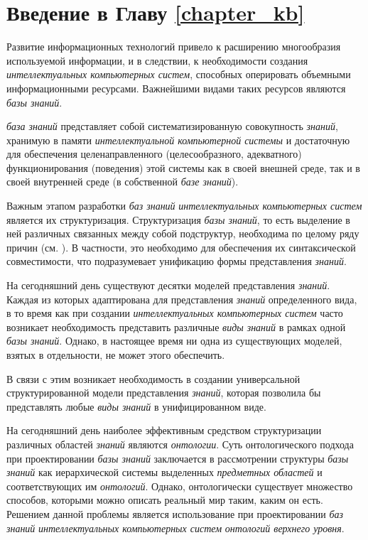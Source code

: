 \section*{Введение в Главу \ref{chapter_kb}}

Развитие информационных технологий привело к расширению многообразия используемой информации, и в следствии, к необходимости создания \textit{интеллектуальных компьютерных систем}, способных оперировать объемными информационными ресурсами. Важнейшими видами таких ресурсов являются \textit{базы знаний}.

\textit{база знаний} представляет собой систематизированную совокупность \textit{знаний}, хранимую в памяти \textit{интеллектуальной компьютерной системы} и достаточную для обеспечения целенаправленного (целесообразного, адекватного) функционирования (поведения) этой системы как в своей внешней среде, так и в своей внутренней среде (в собственной \textit{базе знаний}).

Важным этапом разработки \textit{баз знаний} \textit{интеллектуальных компьютерных систем} является их структуризация. Структуризация \textit{базы знаний}, то есть выделение в ней различных связанных между собой подструктур, необходима по целому ряду причин (см. ). В частности, это необходимо для обеспечения их синтаксической совместимости, что подразумевает унификацию формы представления \textit{знаний}.

На сегодняшний день существуют десятки моделей представления \textit{знаний}. Каждая из которых адаптирована для представления \textit{знаний} определенного вида, в то время как при создании \textit{интеллектуальных компьютерных систем} часто возникает необходимость представить различные \textit{виды знаний} в рамках одной \textit{базы знаний}. Однако, в настоящее время ни одна из существующих моделей, взятых в отдельности, не может этого обеспечить. 

В связи с этим возникает необходимость в создании универсальной структурированной модели представления \textit{знаний}, которая позволила бы представлять любые \textit{виды знаний} в унифицированном виде.

На сегодняшний день наиболее эффективным средством структуризации различных областей \textit{знаний} являются \textit{онтологии}. Суть онтологического подхода при проектировании \textit{базы знаний} заключается в рассмотрении структуры \textit{базы знаний} как иерархической системы выделенных \textit{предметных областей} и соответствующих им \textit{онтологий}. Однако, онтологически существует множество способов, которыми можно описать реальный мир таким, каким он есть. Решением данной проблемы является использование при проектировании \textit{баз знаний} \textit{интеллектуальных компьютерных систем} \textit{онтологий верхнего уровня}.

